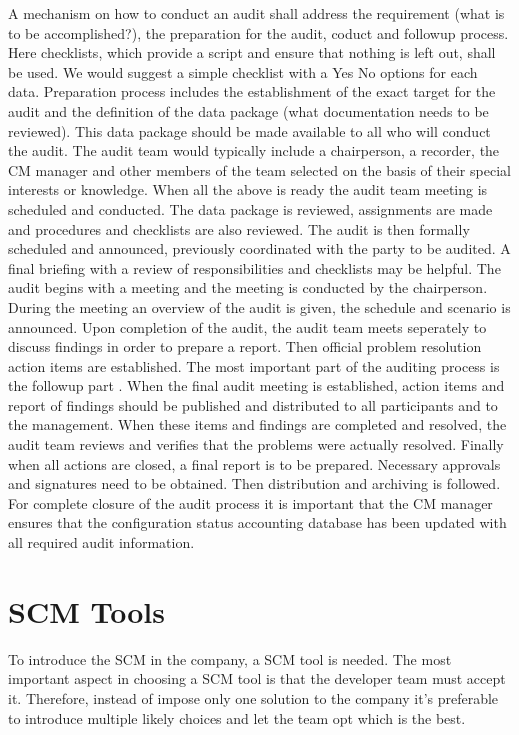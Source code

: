 \documentclass[a4paper]{article}
\begin{document}
 A mechanism on how to conduct an audit shall address the requirement (what is to be accomplished?), the preparation for the audit, coduct and followup process. Here checklists, which provide a script and ensure that nothing is left out, shall be used. We would suggest a simple checklist with a Yes No options for each data. Preparation process includes the establishment of the exact target for the audit and the definition of the data package (what documentation needs to be reviewed). This data package should be made available to all who will conduct the audit. The audit team would typically include a chairperson, a recorder, the CM manager and other members of the team selected on the basis of their special interests or knowledge. When all the above is ready the audit team meeting is scheduled and conducted. The data package is reviewed, assignments are made and procedures and checklists are also reviewed. The audit is then formally scheduled and announced, previously coordinated with the party to be audited. A final briefing with a review of responsibilities and checklists may be helpful. The audit begins with a meeting and the meeting is conducted by the chairperson. During the meeting an overview of the audit is given, the schedule and scenario is announced. Upon completion of the audit, the audit team meets seperately to discuss findings in order to prepare a report. Then official problem resolution action items are established. The most important part of the auditing process is the followup part \cite{daniels}. When the final audit meeting is established, action items and report of findings should be published and distributed to all participants and to the management. When these items and findings are completed and resolved, the audit team reviews and verifies that the problems were actually resolved. Finally when all actions are closed, a final report is to be prepared. Necessary approvals and signatures need to be obtained. Then distribution and archiving is followed. For complete closure of the audit process it is important that the CM manager ensures that the configuration status accounting database has been updated with all required audit information.

\section{SCM Tools}

To introduce the SCM in the company, a SCM tool is needed.
The most important aspect in choosing a SCM tool is that the developer team must accept it.
Therefore, instead of impose only one solution to the company it's preferable to introduce multiple likely choices and let the team opt which is the best.
\end{document}
